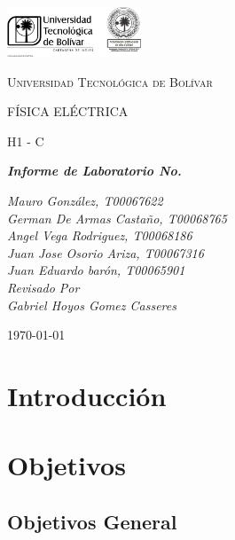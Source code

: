 \documentclass[letterpaper, 12pt]{article}
\begin{document}
\begin{titlepage}
	\centering
	\includegraphics[width=0.3\textwidth]{Images/logo_utb.png}\par\vspace{1cm}
	{\scshape\LARGE Universidad Tecnológica de Bolívar \par}
	\vspace{1cm}

	{\scshape\Large FÍSICA ELÉCTRICA \par}
	\vspace{.2cm}

	{\scshape\Large H1 - C \par}
	\vspace{1cm}
	\slshape {\Large \bfseries{}Informe de Laboratorio No.  \\}
	\vspace{1cm}

	\slshape {\itshape{} Mauro González, T00067622 \\}
	\slshape {\itshape{} German De Armas Castaño, T00068765 \\}
	\slshape {\itshape{} Angel Vega Rodriguez, T00068186 \\}
	\slshape {\itshape{} Juan Jose Osorio Ariza, T00067316 \\}
	\slshape {\itshape{} Juan Eduardo barón, T00065901 \\}
	\vfill
	Revisado Por \\
	Gabriel Hoyos Gomez Casseres\\
	{\large \today\par}
\end{titlepage}

\section{Introducción}


\section{Objetivos}

\subsection{Objetivos General}
\end{document}
